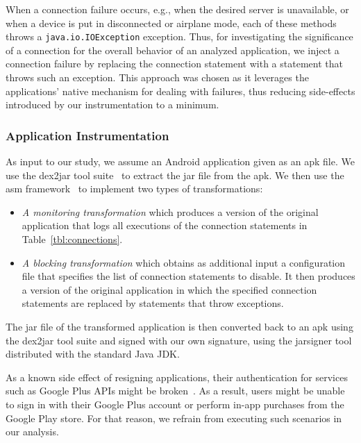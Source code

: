 When a connection failure occurs, e.g., when the desired server is unavailable, or when a device is put in disconnected or airplane mode, each of these methods throws a \texttt{java.io.IOException} exception. 
Thus, for investigating the significance of a connection for the overall behavior of an analyzed application, we inject a connection failure by replacing the connection statement with a statement that throws such an exception. 
This approach was chosen as it leverages the applications' native mechanism for dealing with failures, thus reducing side-effects introduced by our instrumentation to a minimum.

\subsubsection{Application Instrumentation}
As input to our study, we assume an Android application given as an apk file. 
We use the dex2jar tool suite~\cite{dex2jar} to extract the jar file from the apk.
We then use the asm framework~\cite{asm} to implement two types of transformations: 
\vspace{-0.05in}
\begin{itemize}[leftmargin=0.5cm]%
\item \emph{A monitoring transformation} which produces a version of the original application that logs all executions of the connection statements in Table~\ref{tbl:connections}. 
\item \emph{A blocking transformation} which obtains as additional input a configuration file that specifies the list of connection statements to disable. It then produces a version of the original application in which the specified connection statements are replaced by statements that throw exceptions.
\end{itemize}
The jar file of the transformed application is then converted back to an apk using the dex2jar tool suite and signed with our own signature, using the jarsigner tool distributed with the standard Java JDK.
 
As a known side effect of resigning applications, their authentication for services such as Google Plus APIs might be broken~\cite{googleAPI}. As a result, users might be unable to sign in with their Google Plus account or perform in-app purchases from the Google Play store. For that reason, we refrain from executing such scenarios in our analysis. %

